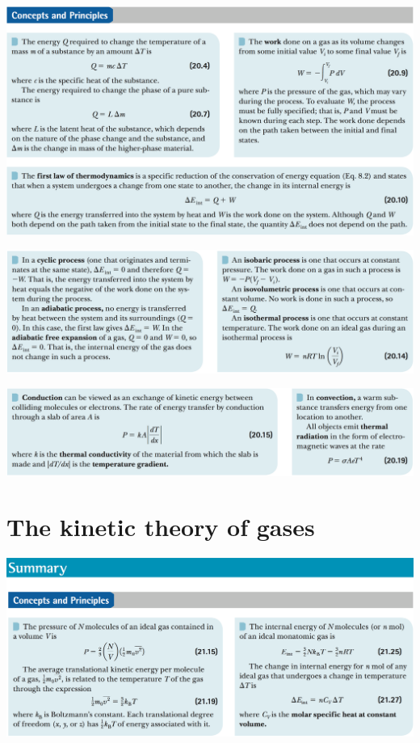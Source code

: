 \documentclass[12pt,a4paper]{article}
\newcommand{\N}{\noindent}
\begin{document}
		\vspace{2mm}
		\N \includegraphics[scale=.42]{2_b.png}
		
		\vspace{2mm}
		\N \includegraphics[scale=.42]{2_c.png}
		
		\vspace{2mm}
		\N \includegraphics[scale=.42]{2_d.png}
		
	\section{The kinetic theory of gases}
		\N \includegraphics[scale=.42]{3_a.png}
		
\end{document}
